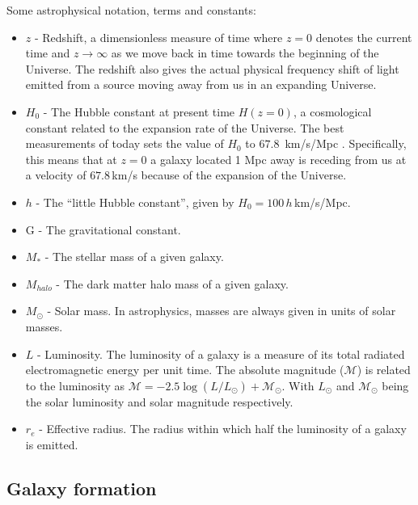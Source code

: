 Some astrophysical notation, terms and constants:

\begin{itemize}
    \item $z$ - Redshift, a dimensionless measure of time where $z=0$ denotes the current time and $z \rightarrow \infty$ as we move back in time towards the beginning of the Universe. The redshift also gives the actual physical frequency shift of light emitted from a source moving away from us in an expanding Universe.
    \item $H_{0}$ - The Hubble constant at present time $H(z=0)$, a cosmological constant related to the expansion rate of the Universe. The best measurements of today sets the value of $H_0$ to $67.8\, $ km/s/Mpc \parencite{Planck2016}. Specifically, this means that at $z=0$ a galaxy located 1 Mpc away is receding from us at a velocity of $67.8\,$km/s because of the expansion of the Universe.
    \item $h$ - The ``little Hubble constant'', given by $H_0 = 100\,h\,$km/s/Mpc.
    \item G - The gravitational constant. 
    \item $M_{*}$ - The stellar mass of a given galaxy.
    \item $M_{halo}$ - The dark matter halo mass of a given galaxy.
    \item $M_{\odot}$ - Solar mass. In astrophysics, masses are always given in units of solar masses.
    \item $L$ - Luminosity. The luminosity of a galaxy is a measure of its total radiated electromagnetic energy per unit time. The absolute magnitude ($\mathcal{M}$) is related to the luminosity as $\mathcal{M} = -2.5 \log(L/L_\odot) + \mathcal{M}_\odot$. With $L_\odot$ and $\mathcal{M}_\odot$ being the solar luminosity and solar magnitude respectively.
    \item $r_e$ - Effective radius. The radius within which half the luminosity of a galaxy is emitted.
\end{itemize}

\subsection{Galaxy formation}

